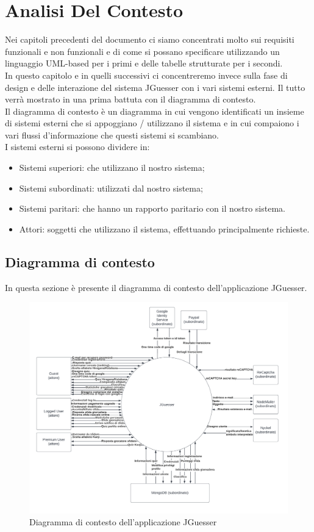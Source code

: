 \section{Analisi Del Contesto}
Nei capitoli precedenti del documento ci siamo concentrati molto sui requisiti funzionali e non funzionali e di come si possano specificare utilizzando un linguaggio UML-based per i primi e delle tabelle strutturate per i secondi. \\
In questo capitolo e in quelli successivi ci concentreremo invece sulla fase di design e delle interazione del sistema JGuesser con i vari sistemi esterni. Il tutto verrà mostrato in una prima battuta con il diagramma di contesto. \\
Il diagramma di contesto è un diagramma in cui vengono identificati un insieme di sistemi esterni che si appoggiano / utilizzano il sistema e in cui compaiono i vari flussi d'informazione che questi sistemi si scambiano. \\
I sistemi esterni si possono dividere in:
\begin{itemize}
    \item Sistemi superiori: che utilizzano il nostro sistema;
    \item Sistemi subordinati: utilizzati dal nostro sistema;
    \item Sistemi paritari: che hanno un rapporto paritario con il nostro sistema.
    \item Attori: soggetti che utilizzano il sistema, effettuando principalmente richieste.
\end{itemize}

\subsection{Diagramma di contesto}
In questa sezione è presente il diagramma di contesto dell'applicazione JGuesser. \\
\begin{figure}[!h]
\centering
\includegraphics[scale=0.23]{images/diagramma_di_contesto.png}
\caption{Diagramma di contesto dell'applicazione JGuesser}
\label{fig:diagramma_di_contesto}
\end{figure}
\noindent

